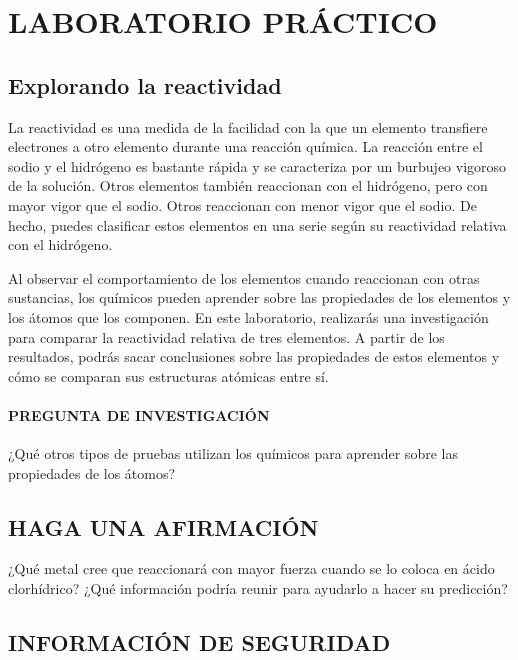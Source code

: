 \documentclass[a4paper,11pt]{exam}
\begin{document}
\section*{LABORATORIO PRÁCTICO}

\subsection*{Explorando la reactividad}

La reactividad es una medida de la facilidad con la que un elemento transfiere electrones a otro elemento durante una reacción química. La reacción entre el sodio y el hidrógeno es bastante rápida y se caracteriza por un burbujeo vigoroso de la
solución. Otros elementos también reaccionan con el hidrógeno, pero con mayor vigor que el sodio. Otros reaccionan con menor vigor que el sodio. De hecho, puedes clasificar estos elementos en una serie según su reactividad relativa con el hidrógeno.

Al observar el comportamiento de los elementos cuando reaccionan con otras
sustancias, los químicos pueden aprender sobre las propiedades de los elementos y
los átomos que los componen. En este laboratorio, realizarás una investigación
para comparar la reactividad relativa de tres elementos. A partir de los resultados, podrás
sacar conclusiones sobre las propiedades de estos elementos y
cómo se comparan sus estructuras atómicas entre sí.

\paragraph{PREGUNTA DE INVESTIGACIÓN} ¿Qué otros tipos de pruebas utilizan los químicos para
aprender sobre las propiedades de los átomos?

\subsection*{HAGA UNA AFIRMACIÓN}

¿Qué metal cree que reaccionará con mayor fuerza cuando se lo coloca en
ácido clorhídrico? ¿Qué información podría reunir para ayudarlo a hacer
su predicción?

\subsection*{INFORMACIÓN DE SEGURIDAD}
\end{document}
